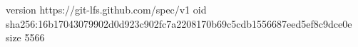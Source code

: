 version https://git-lfs.github.com/spec/v1
oid sha256:16b17043079902d0d923c902fc7a2208170b69c5cdb1556687eed5ef8c9dce0e
size 5566
